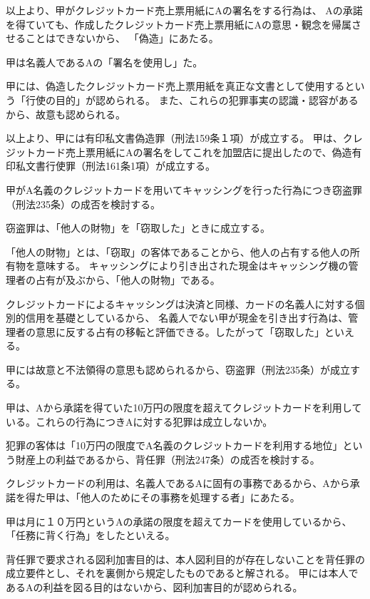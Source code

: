 \documentclass[11pt]{jsarticle}
\begin{document}
			以上より、甲がクレジットカード売上票用紙にAの署名をする行為は、
			Aの承諾を得ていても、作成したクレジットカード売上票用紙にAの意思・観念を帰属させることはできないから、
			「偽造」にあたる。
		
		\sectionC{}
			甲は名義人であるAの「署名を使用し」た。
	
		\sectionC{}
			甲には、偽造したクレジットカード売上票用紙を真正な文書として使用するという「行使の目的」が認められる。
			また、これらの犯罪事実の認識・認容があるから、故意も認められる。
		
			以上より、甲には有印私文書偽造罪（刑法159条１項）が成立する。
		甲は、クレジットカード売上票用紙にAの署名をしてこれを加盟店に提出したので、偽造有印私文書行使罪（刑法161条1項）が成立する。


	甲がA名義のクレジットカードを用いてキャッシングを行った行為につき窃盗罪（刑法235条）の成否を検討する。
	
	窃盗罪は、「他人の財物」を「窃取した」ときに成立する。
	
	「他人の財物」とは、「窃取」の客体であることから、他人の占有する他人の所有物を意味する。
	キャッシングにより引き出された現金はキャッシング機の管理者の占有が及ぶから、「他人の財物」である。
	
	クレジットカードによるキャッシングは決済と同様、カードの名義人に対する個別的信用を基礎としているから、
	名義人でない甲が現金を引き出す行為は、管理者の意思に反する占有の移転と評価できる。したがって「窃取した」といえる。
	
	甲には故意と不法領得の意思も認められるから、窃盗罪（刑法235条）が成立する。
	
	甲は、Aから承諾を得ていた10万円の限度を超えてクレジットカードを利用している。これらの行為につきAに対する犯罪は成立しないか。
	
	犯罪の客体は「10万円の限度でA名義のクレジットカードを利用する地位」という財産上の利益であるから、背任罪（刑法247条）の成否を検討する。
	
	クレジットカードの利用は、名義人であるAに固有の事務であるから、Aから承諾を得た甲は、「他人のためにその事務を処理する者」にあたる。
	
	甲は月に１０万円というAの承諾の限度を超えてカードを使用しているから、「任務に背く行為」をしたといえる。
	
	背任罪で要求される図利加害目的は、本人図利目的が存在しないことを背任罪の成立要件とし、それを裏側から規定したものであると解される。
	甲には本人であるAの利益を図る目的はないから、図利加害目的が認められる。
	
\end{document}

